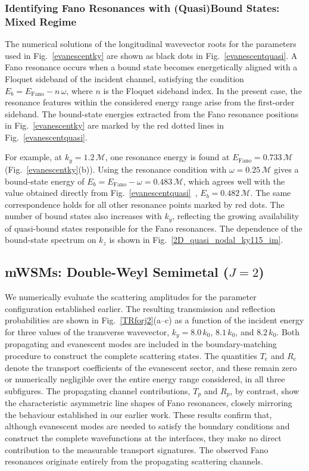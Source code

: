 \documentclass[aps,prb,onecolumn,longbibliography,nofootinbib,citeautoscript,10pt]{revtex4-2}
\begin{document}
\subsubsection{Identifying Fano Resonances with (Quasi)Bound States: Mixed Regime}

The numerical solutions of the longitudinal wavevector roots for the parameters used in Fig.~\ref{evanescentky} are shown as black dots in Fig.~\ref{evanescentquasi}. A Fano resonance occurs when a bound state becomes energetically aligned with a Floquet sideband of the incident channel, satisfying the condition $E_b=E_{\text{Fano}}-n\,\omega$, where $n$ is the Floquet sideband index. In the present case, the resonance features within the considered energy range arise from the first-order sideband. The bound-state energies extracted from the Fano resonance positions in Fig.~\ref{evanescentky} are marked by the red dotted lines in Fig.~\ref{evanescentquasi}.

For example, at $k_y=1.2\,\mathcal{M}$, one resonance energy is found at $E_{\text{Fano}}=0.733\,\mathcal{M}$ (Fig.~\ref{evanescentky}(b)). Using the resonance condition with $\omega=0.25\,\mathcal{M}$ gives a bound-state energy of $E_b=E_{\text{Fano}}-\omega=0.483\,\mathcal{M}$, which agrees well with the value obtained directly from Fig.~\ref{evanescentquasi} \,,  $E_b=0.482\,\mathcal{M}$. The same correspondence holds for all other resonance points marked by red dots. The number of bound states also increases with $k_y$, reflecting the growing availability of quasi-bound states responsible for the Fano resonances. The dependence of the bound-state spectrum on $k_z$ is shown in Fig.~\ref{2D_quasi_nodal_ky115_im}.


\subsection{mWSMs: Double-Weyl Semimetal ($J=2$)}

We numerically evaluate the scattering amplitudes for the parameter configuration established earlier. The resulting transmission and reflection probabilities are shown in Fig.~\ref{TRforj2}(a–c) as a function of the incident energy for three values of the transverse wavevector, $k_y = 8.0\,k_0$, $8.1\,k_0$, and $8.2\,k_0$. Both propagating and evanescent modes are included in the boundary-matching procedure to construct the complete scattering states. The quantities $T_e$ and $R_e$ denote the transport coefficients of the evanescent sector, and these remain zero or numerically negligible over the entire energy range considered, in all three subfigures. The propagating channel contributions, $T_p$ and $R_p$, by contrast, show the characteristic asymmetric line shapes of Fano resonances, closely mirroring the behaviour established in our earlier work. These results confirm that, although evanescent modes are needed to satisfy the boundary conditions and construct the complete wavefunctions at the interfaces, they make no direct contribution to the measurable transport signatures. The observed Fano resonances originate entirely from the propagating scattering channels.
\end{document}
